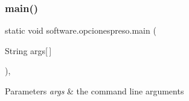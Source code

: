 \mbox{\label{classsoftware_1_1opcionespreso_a7aaff594f3bae88e5df8471683979b78}} 
\subsubsection{\texorpdfstring{main()}{main()}}
{\footnotesize\ttfamily static void software.\+opcionespreso.\+main (\begin{DoxyParamCaption}\item[{String}]{args\mbox{[}$\,$\mbox{]} }\end{DoxyParamCaption})\hspace{0.3cm}{\ttfamily [inline]}, {\ttfamily [static]}}


\begin{DoxyParams}{Parameters}
{\em args} & the command line arguments \\
\hline
\end{DoxyParams}

